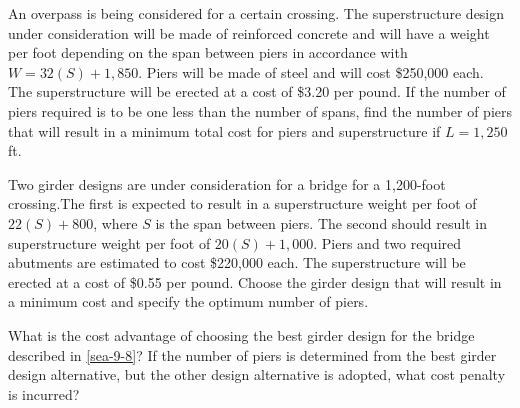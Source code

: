 \begin{exercises}
    \begin{exercise}
    \label{sea-9-7}
        An overpass is being considered for a certain crossing. The superstructure design under consideration will be made of reinforced concrete and will have a weight per foot depending on the span between piers in accordance with $W=32(S)+1,850$. Piers will be made of steel and will cost \$250,000 each. The superstructure will be erected at a cost of \$3.20 per pound. If the number of piers required is to be one less than the number of spans, find the number of piers that will result in a minimum total cost for piers and superstructure if $L=1,250$ft. 
    \end{exercise}
    \begin{solution}
    \end{solution}
    
    \begin{exercise}
    \label{sea-9-8}
        Two girder designs are under consideration for a bridge for a 1,200-foot crossing.The first is expected to result in a superstructure weight per foot of $22(S)+800$, where $S$ is the span between piers. The second should result in superstructure weight per foot of $20(S)+1,000$. Piers and two required abutments are estimated to cost \$220,000 each. The superstructure will be erected at a cost of \$0.55 per pound. Choose the girder design that will result in a minimum cost and specify the optimum number of piers.
    \end{exercise}
    \begin{solution}
    \end{solution}
    
    \begin{exercise}
    \label{sea-9-9}
        What is the cost advantage of choosing the best girder design for the bridge described in \ref{sea-9-8}? If the number of piers is determined from the best girder design alternative, but the other design alternative is adopted, what cost penalty is incurred?
    \end{exercise}
    \begin{solution}
    \end{solution}
    

\end{exercises}
